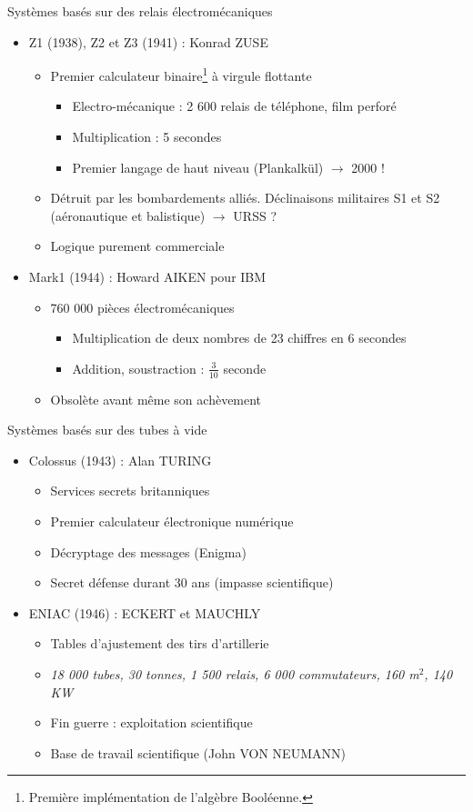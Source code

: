 \begin{frame}{Systèmes basés sur des relais électromécaniques}
\begin{itemize}
\item<1> Z1 (1938), Z2 et Z3 (1941) : Konrad ZUSE \cite{wp-zuse}
\begin{itemize}
\item Premier calculateur binaire\footnote{Première implémentation de l'algèbre Booléenne.} à virgule flottante
\begin{itemize}
\item Electro-mécanique : 2 600 relais de téléphone, film perforé
\item Multiplication : 5 secondes
\item Premier langage de haut niveau (Plankalkül) $\rightarrow$ 2000 !
\end{itemize}
\item Détruit par les bombardements alliés. Déclinaisons militaires S1 et S2 (aéronautique et balistique) $\rightarrow$ URSS ?
\item Logique purement commerciale
\end{itemize}
\item<2> Mark1 (1944) : Howard AIKEN pour IBM
\begin{itemize}
\item 760 000 pièces électromécaniques
\begin{itemize}
\item Multiplication de deux nombres de 23 chiffres en 6 secondes
\item Addition, soustraction : $\frac{3}{10}$ seconde
\end{itemize}
\item Obsolète avant même son achèvement
\end{itemize}
\end{itemize}
\end{frame}

\begin{frame}{Systèmes basés sur des tubes à vide}
\begin{itemize}
\item<1> Colossus (1943) : Alan TURING
\begin{itemize}
\item Services secrets britanniques
\item Premier calculateur électronique numérique
\item Décryptage des messages (Enigma)
\item Secret défense durant 30 ans (impasse scientifique)
\end{itemize}
\item<2> ENIAC (1946) : ECKERT et MAUCHLY
\begin{itemize}
\item Tables d'ajustement des tirs d'artillerie
\item \textit{18 000 tubes, 30 tonnes, 1 500 relais, 6 000 commutateurs, 160 m$^2$, 140 KW}
\item Fin guerre : exploitation scientifique
\item Base de travail scientifique (John VON NEUMANN)
\end{itemize}
\end{itemize}
\end{frame}

